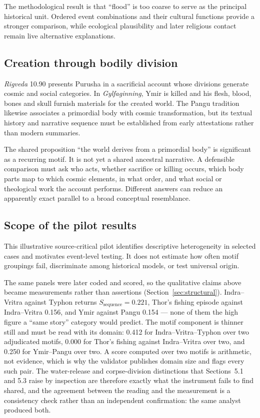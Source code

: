 \documentclass[11pt]{article}
\DeclareRobustCommand{\_}{\textunderscore\allowbreak}
\begin{document}
The methodological result is that ``flood'' is too coarse to serve as the
principal historical unit. Ordered event combinations and their cultural
functions provide a stronger comparison, while ecological plausibility and later
religious contact remain live alternative explanations.

\subsection{Creation through bodily division}

\emph{Rigveda} 10.90 presents Purusha in a sacrificial account whose divisions
generate cosmic and social categories. In \emph{Gylfaginning}, Ymir is killed and
his flesh, blood, bones and skull furnish materials for the created world. The
Pangu tradition likewise associates a primordial body with cosmic transformation,
but its textual history and narrative sequence must be established from early
attestations rather than modern summaries.

The shared proposition ``the world derives from a primordial body'' is
significant as a recurring motif. It is not yet a shared ancestral narrative. A
defensible comparison must ask who acts, whether sacrifice or killing occurs,
which body parts map to which cosmic elements, in what order, and what social or
theological work the account performs. Different answers can reduce an apparently
exact parallel to a broad conceptual resemblance.

\subsection{Scope of the pilot results}

This illustrative source-critical pilot identifies descriptive heterogeneity in
selected cases and motivates event-level testing. It does not estimate how often
motif groupings fail, discriminate among historical models, or test universal
origin.

The same panels were later coded and scored, so the qualitative claims above
became measurements rather than assertions (Section~\ref{sec:structural}).
Indra--Vritra against Typhon returns \(S_{\mathrm{sequence}} = 0.221\), Thor's
fishing episode against Indra--Vritra 0.156, and Ymir against Pangu 0.154 ---
none of them the high figure a ``same story'' category would predict. The motif
component is thinner still and must be read with its domain: 0.412 for
Indra--Vritra--Typhon over two adjudicated motifs, 0.000 for Thor's fishing
against Indra--Vritra over two, and 0.250 for Ymir--Pangu over two. A score
computed over two motifs is arithmetic, not evidence, which is why the validator
publishes domain size and flags every such pair. The water-release and
corpse-division distinctions that Sections~5.1 and 5.3 raise by inspection are
therefore exactly what the instrument fails to find shared, and the agreement
between the reading and the measurement is a consistency check rather than an
independent confirmation: the same analyst produced both.
\end{document}
